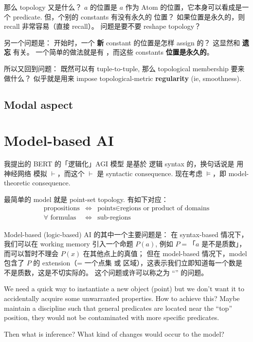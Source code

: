 那么 topology 又是什么？  $a$ 的位置是 $a$ 作为 Atom 的位置，它本身可以看成是一个 predicate.  但，个别的 constants 有没有永久的 位置？  如果位置是永久的，则 recall 非常容易（直接 recall）。 问题是要不要 reshape topology？  

另一个问题是： 开始时，一个 \textbf{新} constant 的位置是怎样 assign 的？  这显然和 \textbf{遗忘} 有关。  一个简单的做法就是有 ，而这些 constants \textbf{位置是永久的}。

所以又回到问题： 既然可以有 tuple-to-tuple, 那么 topological membership 要来做什么？  似乎就是用来 impose topological-metric \textbf{regularity} (ie, smoothness).

\subsection{Modal aspect}

\section{Model-based AI}

我提出的 BERT 的「逻辑化」AGI 模型 是基於 逻辑 syntax 的，换句话说是 用神经网络 模拟 $\vdash$，而这个 $\vdash$ 是 syntactic consequence.  现在考虑 $\models$，即 model-theoretic consequence.

最简单的 model 就是 point-set topology.  有如下对应：
\begin{eqnarray}
\mbox{propositions} & \Leftrightarrow & \mbox{points} \in \mbox{regions or product of domains} \\
\forall \mbox{ formulas} & \Leftrightarrow & \mbox{sub-regions} \nonumber
\end{eqnarray}

Model-based (logic-based) AI 的其中一个主要问题是： 在 syntax-based 情况下，我们可以在 working memory 引入一个命题 $P(a)$, 例如 $P =$「$a$ 是不是质数」，而可以暂时不理会 $P(x)$ 在其他点上的真值； 但在 model-based 情况下，model 包含了 $P$ 的 extension（= 一个点集 或 区域），这表示我们立即知道每一个数是不是质数，这是不切实际的。 这个问题或许可以称之为 ``'' 的问题。

We need a quick way to instantiate a new object (point) but we don't want it to accidentally acquire some unwarranted properties.  How to achieve this?  Maybe maintain a discipline such that general predicates are located near the ``top'' position, they would not be contaminated with more specific predicates.  

Then what is inference?  What kind of changes would occur to the model?

